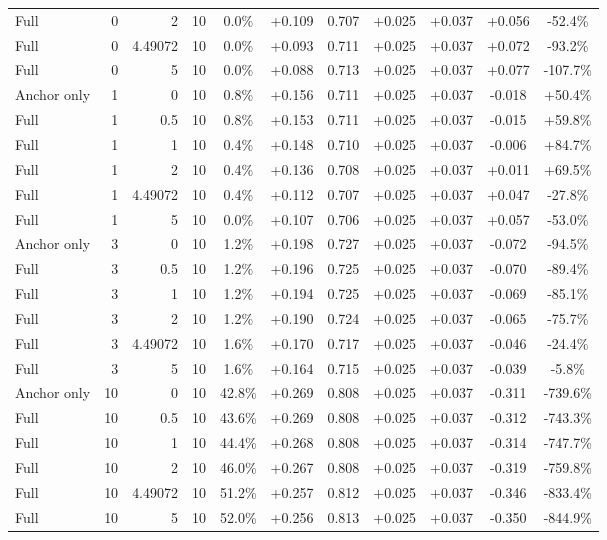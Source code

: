\begin{table}[htbp]
\begin{tabular}{lrrrccccccc}
Full & 0 & 2 & 10 & 0.0\% & +0.109 & 0.707 & +0.025 & +0.037 & +0.056 & -52.4\% \\
Full & 0 & 4.49072 & 10 & 0.0\% & +0.093 & 0.711 & +0.025 & +0.037 & +0.072 & -93.2\% \\
Full & 0 & 5 & 10 & 0.0\% & +0.088 & 0.713 & +0.025 & +0.037 & +0.077 & -107.7\% \\
Anchor only & 1 & 0 & 10 & 0.8\% & +0.156 & 0.711 & +0.025 & +0.037 & -0.018 & +50.4\% \\
Full & 1 & 0.5 & 10 & 0.8\% & +0.153 & 0.711 & +0.025 & +0.037 & -0.015 & +59.8\% \\
Full & 1 & 1 & 10 & 0.4\% & +0.148 & 0.710 & +0.025 & +0.037 & -0.006 & +84.7\% \\
Full & 1 & 2 & 10 & 0.4\% & +0.136 & 0.708 & +0.025 & +0.037 & +0.011 & +69.5\% \\
Full & 1 & 4.49072 & 10 & 0.4\% & +0.112 & 0.707 & +0.025 & +0.037 & +0.047 & -27.8\% \\
Full & 1 & 5 & 10 & 0.0\% & +0.107 & 0.706 & +0.025 & +0.037 & +0.057 & -53.0\% \\
Anchor only & 3 & 0 & 10 & 1.2\% & +0.198 & 0.727 & +0.025 & +0.037 & -0.072 & -94.5\% \\
Full & 3 & 0.5 & 10 & 1.2\% & +0.196 & 0.725 & +0.025 & +0.037 & -0.070 & -89.4\% \\
Full & 3 & 1 & 10 & 1.2\% & +0.194 & 0.725 & +0.025 & +0.037 & -0.069 & -85.1\% \\
Full & 3 & 2 & 10 & 1.2\% & +0.190 & 0.724 & +0.025 & +0.037 & -0.065 & -75.7\% \\
Full & 3 & 4.49072 & 10 & 1.6\% & +0.170 & 0.717 & +0.025 & +0.037 & -0.046 & -24.4\% \\
Full & 3 & 5 & 10 & 1.6\% & +0.164 & 0.715 & +0.025 & +0.037 & -0.039 & -5.8\% \\
Anchor only & 10 & 0 & 10 & 42.8\% & +0.269 & 0.808 & +0.025 & +0.037 & -0.311 & -739.6\% \\
Full & 10 & 0.5 & 10 & 43.6\% & +0.269 & 0.808 & +0.025 & +0.037 & -0.312 & -743.3\% \\
Full & 10 & 1 & 10 & 44.4\% & +0.268 & 0.808 & +0.025 & +0.037 & -0.314 & -747.7\% \\
Full & 10 & 2 & 10 & 46.0\% & +0.267 & 0.808 & +0.025 & +0.037 & -0.319 & -759.8\% \\
Full & 10 & 4.49072 & 10 & 51.2\% & +0.257 & 0.812 & +0.025 & +0.037 & -0.346 & -833.4\% \\
Full & 10 & 5 & 10 & 52.0\% & +0.256 & 0.813 & +0.025 & +0.037 & -0.350 & -844.9\% \\

\end{tabular}
\end{table}
